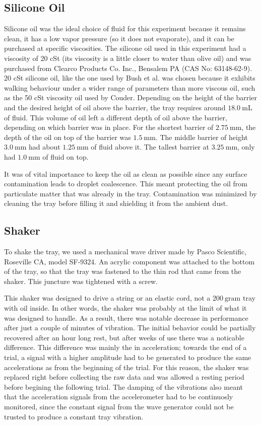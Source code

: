 \subsection{Silicone Oil}
    Silicone oil was the ideal choice of fluid for this experiment because it remains clean, it has a low vapor pressure (so it does not evaporate), and it can be purchased at specific viscosities. The silicone oil used in this experiment had a viscosity of 20 cSt (its viscosity is a little closer to water than olive oil) and was purchased from Clearco Products Co. Inc., Bensalem PA (CAS No: 63148-62-9). 20 cSt silicone oil, like the one used by Bush et al. was chosen because it exhibits walking behaviour under a wider range of parameters than more viscous oil, such as the 50 cSt viscosity oil used by Couder. Depending on the height of the barrier and the desired height of oil above the barrier, the tray requires around $18.0~\mathrm{mL}$ of fluid. This volume of oil left a different depth of oil above the barrier, depending on which barrier was in place. For the shortest barrier of $2.75~\mathrm{mm}$, the depth of the oil on top of the barrier was $1.5~\mathrm{mm}$. The middle barrier of height $3.0~\mathrm{mm}$ had about $1.25~\mathrm{mm}$ of fluid above it. The tallest barrier at $3.25~\mathrm{mm}$, only had $1.0~\mathrm{mm}$ of fluid on top.
    
    It was of vital importance to keep the oil as clean as possible since any surface contamination leads to droplet coalescence. This meant protecting the oil from particulate matter that was already in the tray. Contamination was minimized by cleaning the tray before filling it and shielding it from the ambient dust.
    
\subsection{Shaker}
    To shake the tray, we used a mechanical wave driver made by Pasco Scientific, Roseville CA, model SF-9324. An acrylic component was attached to the bottom of the tray, so that the tray was fastened to the thin rod that came from the shaker. This juncture was tightened with a screw.
    
    This shaker was designed to drive a string or an elastic cord, not a $200~\mathrm{gram}$ tray with oil inside. In other words, the shaker was probably at the limit of what it was designed to handle. As a result, there was notable decrease in performance after just a couple of minutes of vibration. The initial behavior could be partially recovered after an hour long rest, but after weeks of use there was a noticable difference. This difference was mainly the in acceleration; towards the end of a trial, a signal with a higher amplitude had to be generated to produce the same accelerations as from the beginning of the trial. For this reason, the shaker was replaced right before collecting the raw data and was allowed a resting period before begining the following trial. The damping of the vibrations also meant that the acceleration signals from the accelerometer had to be continuosly  monitored, since the constant signal from the wave generator could not be trusted to produce a constant tray vibration. 
    
